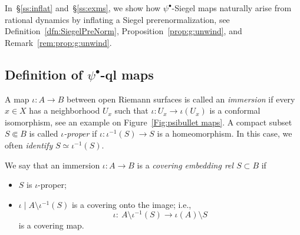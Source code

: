 \documentclass{amsart}
\newcommand{\1}{{\mathbb 1 }}
\theoremstyle{remark}
\numberwithin{equation}{section}
\theoremstyle{definition}
\begin{document}
In~\S\ref{ss:inflat} and~\S\ref{ss:exms}, we show how $\psi^\bullet$-Siegel maps naturally arise from rational dynamics by inflating a Siegel prerenormalization, see Definition~\ref{dfn:SiegelPreNorm}, Proposition~\ref{prop:g:unwind}, and Remark~\ref{rem:prop:g:unwind}.


\subsection{Definition of $\psi^\bullet$-ql maps}\label{ss:psi bullet:defn}
A map $\iota\colon A\to B$ between open Riemann surfaces is called an \emph{immersion} if every $x\in X$ has a neighborhood $U_x$ such that $\iota\colon  U_x\to \iota(U_x)$ is a conformal isomorphism, see an example on Figure~\ref{Fig:psibullet maps}. A compact subset $S\Subset B$ is called \emph{$\iota$-proper} if $\iota\colon \iota^{-1}(S)\to S$ is a homeomorphism. In this case, we often \emph{identify} $S\simeq \iota^{-1}(S)$. 

We say that an immersion $\iota\colon A\to B$ is a \emph{covering embedding rel $S\subset B$} if 
\begin{itemize}
  \item $S$ is $\iota$-proper;
  \item $\iota\mid A\setminus \iota^{-1}(S)$ is a covering onto the image; i.e., 
  \[\iota \colon \ A\setminus \iota^{-1}(S)\longrightarrow \iota(A)\setminus S\]
is a covering map. 
\end{itemize}
\end{document}
